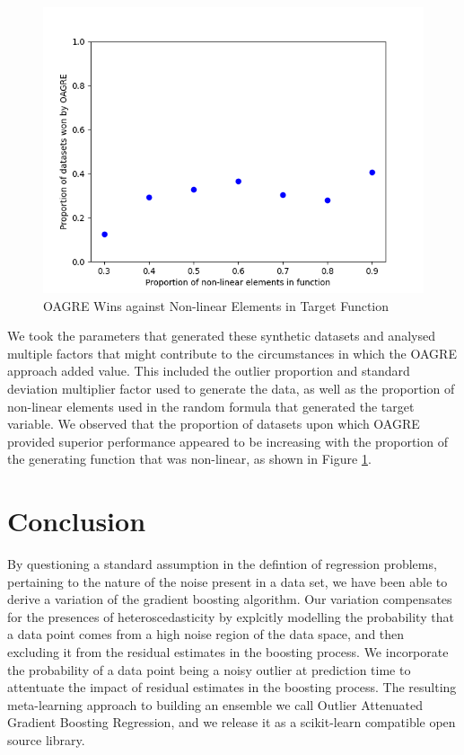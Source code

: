 \documentclass[12pt,a4paper]{article}
\begin{document}
\begin{figure}
\centering
\includegraphics[scale=0.7]{../results/wins_vs_nonlinear_prop.png}
\caption{OAGRE Wins against Non-linear Elements in Target Function}
\label{fig:nonlinear}
\end{figure}

We took the parameters that generated these synthetic datasets and analysed multiple factors that might contribute
to the circumstances in which the OAGRE approach added value. This included the outlier proportion and standard deviation
multiplier factor used to generate the data, as well as the proportion of non-linear elements used in the random formula that
generated the target variable. We observed that the proportion of datasets upon which OAGRE provided superior performance
appeared to be increasing with the proportion of the generating function that was non-linear, as shown in Figure \ref{fig:nonlinear}.

\section{Conclusion}

By questioning a standard assumption in the defintion of regression problems, pertaining to the nature of the noise 
present in a data set, we have been able to derive a variation of the gradient boosting algorithm. Our variation 
compensates for the presences of heteroscedasticity by explcitly modelling the probability that a data point comes
from a high noise region of the data space, and then excluding it from the residual estimates in the boosting process.
We incorporate the probability of a data point being a noisy outlier at prediction time to attentuate the impact of 
residual estimates in the boosting process. 
The resulting meta-learning approach to building an ensemble we call Outlier Attenuated Gradient
Boosting Regression, and we release it as a scikit-learn compatible open source library. 
\end{document}
